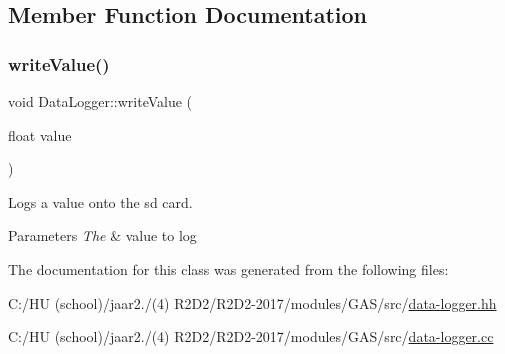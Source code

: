 \subsection{Member Function Documentation}
\mbox{\label{class_data_logger_a6bc493c434d247169fdcca030eed7451}} 
\subsubsection{\texorpdfstring{write\+Value()}{writeValue()}}
{\footnotesize\ttfamily void Data\+Logger\+::write\+Value (\begin{DoxyParamCaption}\item[{float}]{value }\end{DoxyParamCaption})}



Logs a value onto the sd card. 


\begin{DoxyParams}{Parameters}
{\em The} & value to log \\
\hline
\end{DoxyParams}


The documentation for this class was generated from the following files\+:\begin{DoxyCompactItemize}
\item 
C\+:/\+H\+U (school)/jaar2./(4) R2\+D2/\+R2\+D2-\/2017/modules/\+G\+A\+S/src/\hyperlink{data-logger_8hh}{data-\/logger.\+hh}\item 
C\+:/\+H\+U (school)/jaar2./(4) R2\+D2/\+R2\+D2-\/2017/modules/\+G\+A\+S/src/\hyperlink{data-logger_8cc}{data-\/logger.\+cc}\end{DoxyCompactItemize}
